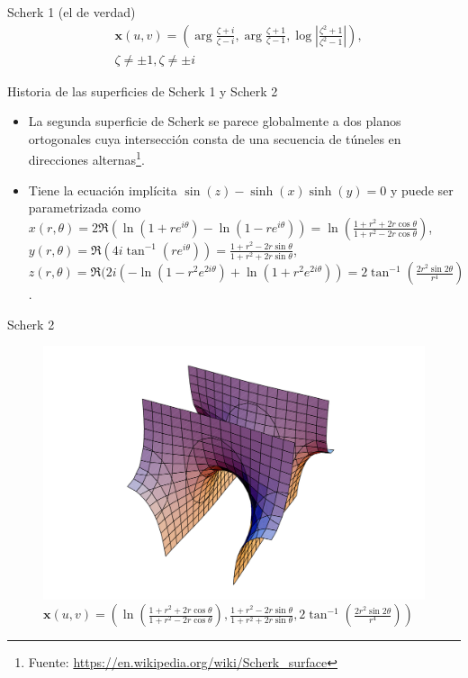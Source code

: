 \documentclass[10pt]{beamer}
\begin{document}
      \begin{frame}{Scherk 1 (el de verdad)}
        \begin{align*}
          &\mathbf{x}(u, v)=\left(\arg \frac{\zeta+i}{\zeta-i}, \arg \frac{\zeta+1}{\zeta-1}, \log \left|\frac{\zeta^2+1}{\zeta^2-1}\right|\right),\\
          &\zeta \neq \pm 1, \zeta \neq \pm i
          \end{align*}
        \end{frame}

    \begin{frame}{Historia de las superficies de Scherk 1 y Scherk 2}
      \begin{itemize}
        \item La segunda superficie de Scherk se parece globalmente a dos planos ortogonales cuya intersección consta de una secuencia de túneles en direcciones alternas\footnote{Fuente: \url{https://en.wikipedia.org/wiki/Scherk_surface}}.
        \item Tiene la ecuación implícita $\sin(z) - \sinh(x)\sinh(y)=0$ y puede ser parametrizada como  $x(r,\theta) = 2 \Re ( \ln(1+re^{i \theta}) - \ln(1-re^{i \theta}) ) = \ln \left( \frac{1+r^2+2r \cos \theta}{1+r^2-2r \cos \theta} \right)$, $y(r,\theta) = \Re ( 4i \tan^{-1}(re^{i \theta})) = \frac{1+r^2-2r \sin\theta}{1+r^2+2r \sin \theta} $, $z(r,\theta) = \Re ( 2i(-\ln(1-r^2e^{2i \theta}) + \ln(1+r^2e^{2i \theta}) ) = 2 \tan^{-1}\left( \frac{2 r^2 \sin 2\theta}{r^4} \right)$.
      \end{itemize}
      \end{frame}
      \begin{frame}{Scherk 2}
        \begin{figure}[H]
          \centering
          \includegraphics[scale=.3]{imagenes/5.png}
          \caption{$\mathbf{x}(u,v)=( \ln \left( \frac{1+r^2+2r \cos \theta}{1+r^2-2r \cos \theta} \right), \frac{1+r^2-2r \sin\theta}{1+r^2+2r \sin \theta} , 2 \tan^{-1}\left( \frac{2 r^2 \sin 2\theta}{r^4} \right))$}
        \end{figure}
        \end{frame}
\end{document}
